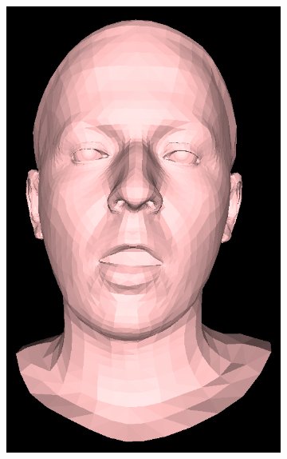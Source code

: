 \documentclass[12pt]{report}
\begin{document}
\begin{figure}[h]
\begin{subfigure}[b]{0.19\textwidth}
        \includegraphics[width=\textwidth]{figures/voca_exp/vocaset_exp4.png}
    \end{subfigure}
    \begin{subfigure}[b]{0.19\textwidth}

\end{subfigure}
\end{figure}
\end{document}
